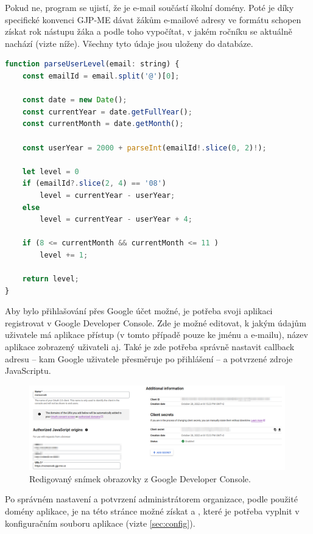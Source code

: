 Pokud ne, program se ujistí, že je e-mail součástí školní domény. Poté je díky specifické konvenci GJP-ME dávat žákům e-mailové adresy ve formátu  schopen získat rok nástupu žáka a podle toho vypočítat, v jakém ročníku se aktuálně nachází (vizte níže). Všechny tyto údaje jsou uloženy do databáze.

\begin{lstlisting}[language=JavaScript,caption={Zjištění aktuálního ročníku uživatele}]
function parseUserLevel(email: string) {
    const emailId = email.split('@')[0];
    
    const date = new Date();
    const currentYear = date.getFullYear();
    const currentMonth = date.getMonth();
    
    const userYear = 2000 + parseInt(emailId!.slice(0, 2)!);
    
    let level = 0
    if (emailId?.slice(2, 4) == '08')
        level = currentYear - userYear;
    else
        level = currentYear - userYear + 4;
    
    if (8 <= currentMonth && currentMonth <= 11 )
        level += 1;
    
    return level;
}
\end{lstlisting}

Aby bylo přihlašování přes Google účet možné, je potřeba svoji aplikaci registrovat v Google Developer Console. Zde je možné editovat, k jakým údajům uživatele má aplikace přístup (v tomto případě pouze ke jménu a e-mailu), název aplikace zobrazený uživateli aj. Také je zde potřeba správně nastavit callback adresu -- kam Google uživatele přesměruje po přihlášení -- a potvrzené zdroje JavaScriptu.

\begin{figure}[H]
    \centering
    \includegraphics[width=420px]{images/02technologie/google-console.png}
    \caption{Redigovaný snímek obrazovky z Google Developer Console.}
\end{figure}

Po správném nastavení a potvrzení administrátorem organizace, podle použité domény aplikace, je na této stránce možné získat  a , které je potřeba vyplnit v konfiguračním souboru aplikace (vizte \ref{sec:config}).

